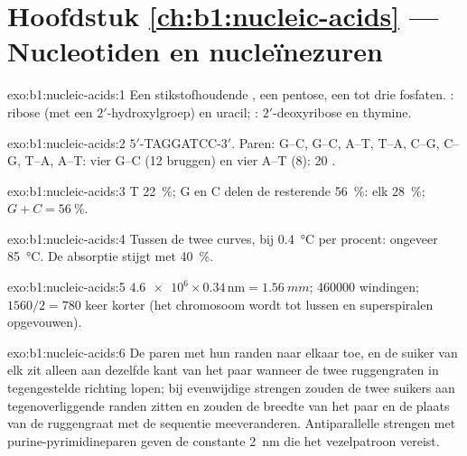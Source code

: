 \section*{Hoofdstuk \ref{ch:b1:nucleic-acids} --- Nucleotiden en nucleïnezuren}

\begin{solution}{exo:b1:nucleic-acids:1}
Een stikstofhoudende , een pentose, een tot drie fosfaten. : ribose (met
een $2'$-hydroxylgroep) en uracil; : $2'$-deoxyribose en thymine.
\end{solution}

\begin{solution}{exo:b1:nucleic-acids:2}
$5'$-TAGGATCC-$3'$. Paren: G--C, G--C, A--T, T--A, C--G, C--G, T--A, A--T: vier
G--C (12 bruggen) en vier A--T (8): 20 .
\end{solution}

\begin{solution}{exo:b1:nucleic-acids:3}
T \qty{22}{\%}; G en C delen de resterende \qty{56}{\%}: elk \qty{28}{\%};
$G + C = \qty{56}{\%}$.
\end{solution}

\begin{solution}{exo:b1:nucleic-acids:4}
Tussen de twee curves, bij \qty{0.4}{\celsius} per procent: ongeveer
\qty{85}{\celsius}. De absorptie stijgt met \qty{40}{\%}.
\end{solution}

\begin{solution}{exo:b1:nucleic-acids:5}
$\num{4.6e6}\times 0.34\,\mathrm{nm} = \qty{1.56}{mm}$; \num{460000} windingen;
$1560/2 = 780$ keer korter (het chromosoom wordt tot lussen en superspiralen
opgevouwen).
\end{solution}

\begin{solution}{exo:b1:nucleic-acids:6}
De  paren met hun randen naar elkaar toe, en de suiker van elk zit alleen aan
dezelfde kant van het paar wanneer de twee ruggengraten in tegengestelde richting
lopen; bij evenwijdige strengen zouden de twee suikers aan tegenoverliggende randen
zitten en zouden de breedte van het paar en de plaats van de ruggengraat met de
sequentie meeveranderen. Antiparallelle strengen met purine-pyrimidineparen geven
de constante \qty{2}{nm} die het vezelpatroon vereist.
\end{solution}

